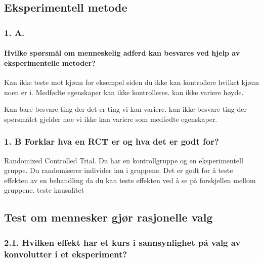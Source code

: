\documentclass[
  12pt,
  a4paper,
  DIV=11,
  numbers=noendperiod]{scrartcl}
\let\oldparagraph\paragraph
\renewcommand{\paragraph}[1]{\oldparagraph{#1}\mbox{}}
\begin{document}
\subsection{Eksperimentell metode}\label{eksperimentell-metode}

\subsubsection{1. A.}\label{a.}

\paragraph{Hvilke spørsmål om menneskelig adferd kan besvares ved hjelp
av eksperimentelle
metoder?}\label{hvilke-spuxf8rsmuxe5l-om-menneskelig-adferd-kan-besvares-ved-hjelp-av-eksperimentelle-metoder}

Kan ikke teste mot kjønn for eksempel siden du ikke kan kontrollere
hvilket kjønn noen er i. Medfødte egenskaper kan ikke kontrolleres. kan
ikke variere høyde.

Kan bare besvare ting der det er ting vi kan variere. kan ikke besvare
ting der spørsmålet gjelder noe vi ikke kan variere som medfødte
egenskaper.

\subsubsection{1. B Forklar hva en RCT er og hva det er godt
for?}\label{b-forklar-hva-en-rct-er-og-hva-det-er-godt-for}

Randomized Controlled Trial. Du har en kontrollgruppe og en
eksperimentell gruppe. Du randomiserer individer inn i gruppene. Det er
godt for å teste effekten av en behandling da du kan teste effekten ved
å se på forskjellen mellom gruppene. teste kausalitet

\subsection{Test om mennesker gjør rasjonelle
valg}\label{test-om-mennesker-gjuxf8r-rasjonelle-valg}

\subsubsection{2.1. Hvilken effekt har et kurs i sannsynlighet på valg
av konvolutter i et
eksperiment?}\label{hvilken-effekt-har-et-kurs-i-sannsynlighet-puxe5-valg-av-konvolutter-i-et-eksperiment}
\end{document}
